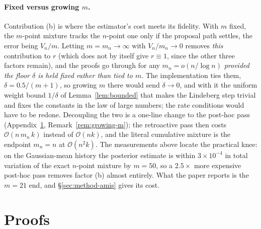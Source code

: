 \documentclass[pdflatex,sn-mathphys-num]{sn-jnl}
\theoremstyle{plain}
\theoremstyle{definition}
\begin{document}
\begin{appendices}
\paragraph{Fixed versus growing $m$.} Contribution (b) is where the estimator's cost meets its fidelity. With $m$ fixed, the $m$-point mixture tracks the $n$-point one only if the proposal path settles, the error being $V_n/m$. Letting $m=m_n\to\infty$ with $V_n/m_n\to0$ removes \emph{this} contribution to $r$ (which does not by itself give $r\equiv1$, since the other three factors remain), and the proofs go through for any $m_n=o(n/\log n)$ \emph{provided the floor $\delta$ is held fixed rather than tied to $m$}. The implementation ties them, $\delta=0.5/(m{+}1)$, so growing $m$ there would send $\delta\to0$, and with it the uniform weight bound $1/\delta$ of Lemma~\ref{lem:bounded} that makes the Lindeberg step trivial and fixes the constants in the law of large numbers; the rate conditions would have to be redone. Decoupling the two is a one-line change to the post-hoc pass (Appendix~\ref{app:theory}, Remark~\ref{rem:growing-m}); the retroactive pass then costs $\mathcal{O}(n\,m_n\,k)$ instead of $\mathcal{O}(nk)$, and the literal cumulative mixture is the endpoint $m_n=n$ at $\mathcal{O}(n^2k)$. The measurements above locate the practical knee: on the Gaussian-mean history the posterior estimate is within $3\times10^{-4}$ in total variation of the exact $n$-point mixture by $m=50$, so a $2.5\times$ more expensive post-hoc pass removes factor (b) almost entirely. What the paper reports is the $m=21$ end, and \S\ref{sec:method-amis} gives its cost.

\section{Proofs}\label{app:theory}


\end{appendices}
\end{document}
